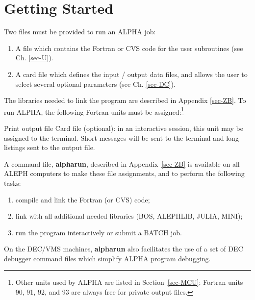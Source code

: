 \chapter{\label{sec-GS}Getting Started}
\par
Two files must be provided to run an ALPHA job:
\begin{enumerate}
\item A file which contains the Fortran or CVS code for the
user
subroutines (see Ch.
\ref{sec-U}).
\item A card file which defines the input / output
data files, and allows the user to select several optional parameters
(see Ch. \ref{sec-DC}).
\end{enumerate}
The libraries needed to link the program are described in Appendix
\ref{sec-ZB}. To run ALPHA, the following Fortran units
must be assigned:\footnote{Other units used by ALPHA are listed in
Section~\ref{sec-MCU}; Fortran units 90, 91, 92, and 93 are always free for
private output files.}
\begin{indentlist}{ 1.25cm}{ 1.50cm}
Print output file
Card file
(optional): in an interactive session,
this unit may be assigned to the
terminal. Short messages will be sent to the terminal
and long listings sent to the output file.
\end{indentlist}
A command file, {\bf alpharun}, described in Appendix~\ref{sec-ZB}
 is available on all ALEPH computers 
to make
these file assignments, and to perform the following tasks:
\begin{enumerate}
\item compile and link the Fortran (or CVS)  code;
\item link with all additional needed libraries (BOS, ALEPHLIB, JULIA, MINI);
\item run the program interactively or submit a BATCH job.
\end{enumerate}
On the DEC/VMS  machines, {\bf alpharun} also facilitates the use of a
set of DEC debugger command files which simplify
ALPHA program debugging.
